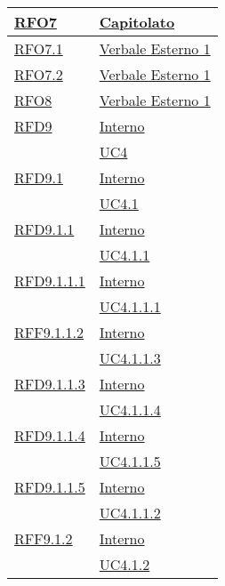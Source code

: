 \begin{longtable}{|>{\centering}m{5cm}|m{5cm}<{\centering}|}
\hyperlink{RFO7}{RFO7} & \hyperlink{Capitolato}{Capitolato}\\ \hline

\hyperlink{RFO7.1}{RFO7.1} & \hyperlink{Verbale Esterno 1}{Verbale Esterno 1}\\ \hline

\hyperlink{RFO7.2}{RFO7.2} & \hyperlink{Verbale Esterno 1}{Verbale Esterno 1}\\ \hline

\hyperlink{RFO8}{RFO8} & \hyperlink{Verbale Esterno 1}{Verbale Esterno 1}\\ \hline

\hyperlink{RFD9}{RFD9} & \hyperlink{Interno}{Interno}\\
& \hyperref[UC4]{UC4}\\ \hline

\hyperlink{RFD9.1}{RFD9.1} & \hyperlink{Interno}{Interno}\\
& \hyperref[UC4.1]{UC4.1}\\ \hline

\hyperlink{RFD9.1.1}{RFD9.1.1} & \hyperlink{Interno}{Interno}\\
& \hyperref[UC4.1.1]{UC4.1.1}\\ \hline

\hyperlink{RFD9.1.1.1}{RFD9.1.1.1} & \hyperlink{Interno}{Interno}\\
& \hyperref[UC4.1.1.1]{UC4.1.1.1}\\ \hline

\hyperlink{RFF9.1.1.2}{RFF9.1.1.2} & \hyperlink{Interno}{Interno}\\
& \hyperref[UC4.1.1.3]{UC4.1.1.3}\\ \hline

\hyperlink{RFD9.1.1.3}{RFD9.1.1.3} & \hyperlink{Interno}{Interno}\\
& \hyperref[UC4.1.1.4]{UC4.1.1.4}\\ \hline

\hyperlink{RFD9.1.1.4}{RFD9.1.1.4} & \hyperlink{Interno}{Interno}\\
& \hyperref[UC4.1.1.5]{UC4.1.1.5}\\ \hline

\hyperlink{RFD9.1.1.5}{RFD9.1.1.5} & \hyperlink{Interno}{Interno}\\
& \hyperref[UC4.1.1.2]{UC4.1.1.2}\\ \hline

\hyperlink{RFF9.1.2}{RFF9.1.2} & \hyperlink{Interno}{Interno}\\
& \hyperref[UC4.1.2]{UC4.1.2}\\ \hline


\end{longtable}
